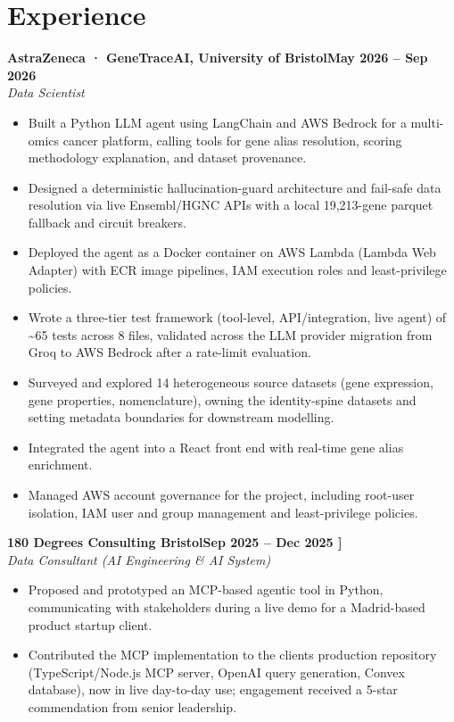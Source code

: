 \documentclass[a4paper,11pt]{article}
\newcommand{\entry}[4]{\needspace{4\baselineskip}\noindent\textbf{#1}\hfill\textbf{#2}\\ \textit{#3}\hfill\textit{#4}\par}
\begin{document}
\section{Experience}
\entry{AstraZeneca · GeneTraceAI, University of Bristol}{May 2026 – Sep 2026}{Data Scientist}{}
\begin{itemize}
  \item Built a Python LLM agent using LangChain and AWS Bedrock for a multi-omics cancer platform, calling tools for gene alias resolution, scoring methodology explanation, and dataset provenance.
  \item Designed a deterministic hallucination-guard architecture and fail-safe data resolution via live Ensembl/HGNC APIs with a local 19,213-gene parquet fallback and circuit breakers.
  \item Deployed the agent as a Docker container on AWS Lambda (Lambda Web Adapter) with ECR image pipelines, IAM execution roles and least-privilege policies.
  \item Wrote a three-tier test framework (tool-level, API/integration, live agent) of \textasciitilde{}65 tests across 8 files, validated across the LLM provider migration from Groq to AWS Bedrock after a rate-limit evaluation.
  \item Surveyed and explored 14 heterogeneous source datasets (gene expression, gene properties, nomenclature), owning the identity-spine datasets and setting metadata boundaries for downstream modelling.
  \item Integrated the agent into a React front end with real-time gene alias enrichment.
  \item Managed AWS account governance for the project, including root-user isolation, IAM user and group management and least-privilege policies.
\end{itemize}
\vspace{4pt}
\entry{180 Degrees Consulting Bristol}{Sep 2025 – Dec 2025   ]}{Data Consultant (AI Engineering \& AI System)}{}
\begin{itemize}
  \item Proposed and prototyped an MCP-based agentic tool in Python, communicating with stakeholders during a live demo for a Madrid-based product startup client.
  \item Contributed the MCP implementation to the client\textquotesingle{}s production repository (TypeScript/Node.js MCP server, OpenAI query generation, Convex database), now in live day-to-day use; engagement received a 5-star commendation from senior leadership.
\end{itemize}
\end{document}
